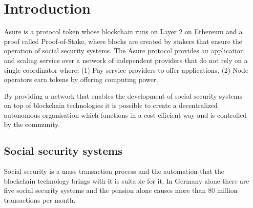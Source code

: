 \section{Introduction}

Asure is a protocol token whose blockchain runs on Layer 2 on Ethereum and a proof called Proof-of-Stake, where blocks are created by stakers that ensure the operation of social security systems. The Asure protocol provides an application and scaling service over a network of independent providers that do not rely on a single coordinator where: (1) Pay service providers to offer applications, (2) Node operators earn tokens by offering computing power.

By providing a network that enables the development of social security systems on top of blockchain technologies it is possible to create a decentralized autonomous organisation which functions in a cost-efficient way and is controlled by the community.


\subsection{Social security systems}

Social security is a mass transaction process and the automation that the blockchain technology brings with it is suitable for it. In Germany alone there are five social security systems and the pension alone causes more than 80 million transactions per month. 


